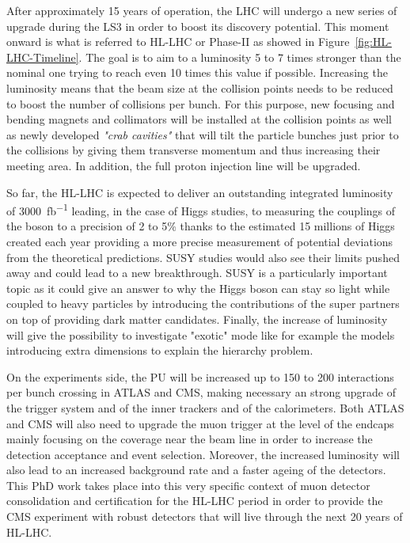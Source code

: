 	After approximately 15 years of operation, the LHC will undergo a new series of upgrade during the LS3 in order to boost its discovery potential. This moment onward is what is referred to HL-LHC or Phase-II as showed in Figure~\ref{fig:HL-LHC-Timeline}. The goal is to aim to a luminosity 5 to 7 times stronger than the nominal one trying to reach even 10 times this value if possible. Increasing the luminosity means that the beam size at the collision points needs to be reduced to boost the number of collisions per bunch. For this purpose, new focusing and bending magnets and collimators will be installed at the collision points as well as newly developed \textit{"crab cavities"} that will tilt the particle bunches just prior to the collisions by giving them transverse momentum and thus increasing their meeting area. In addition, the full proton injection line will be upgraded.
	
	So far, the HL-LHC is expected to deliver an outstanding integrated luminosity of \SI{3000}{fb^{-1}} leading, in the case of Higgs studies, to measuring the couplings of the boson to a precision of 2 to 5\% thanks to the estimated 15 millions of Higgs created each year providing a more precise measurement of potential deviations from the theoretical predictions. SUSY studies would also see their limits pushed away and could lead to a new breakthrough. SUSY is a particularly important topic as it could give an answer to why the Higgs boson can stay so light while coupled to heavy particles by introducing the contributions of the super partners on top of providing dark matter candidates. Finally, the increase of luminosity will give the possibility to investigate "exotic" mode like for example the models introducing extra dimensions to explain the hierarchy problem.
	
	On the experiments side, the \acf{PU} will be increased up to 150 to 200 interactions per bunch crossing in ATLAS and CMS, making necessary an strong upgrade of the trigger system and of the inner trackers and of the calorimeters. Both ATLAS and CMS will also need to upgrade the muon trigger at the level of the endcaps mainly focusing on the coverage near the beam line in order to increase the detection acceptance and event selection. Moreover, the increased luminosity will also lead to an increased background rate and a faster ageing of the detectors. This PhD work takes place into this very specific context of muon detector consolidation and certification for the HL-LHC period in order to provide the CMS experiment with robust detectors that will live through the next 20 years of HL-LHC.

